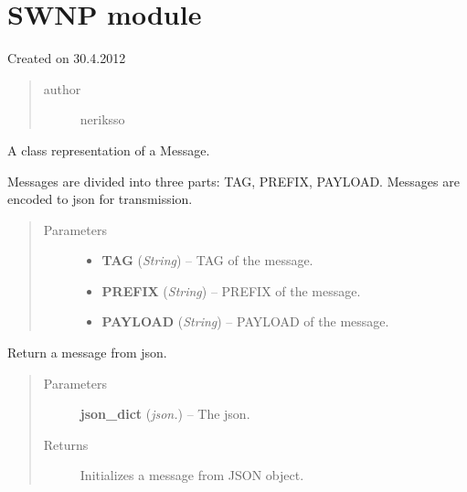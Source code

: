 \documentclass[letterpaper,10pt,english]{sphinxmanual}
\begin{document}
\section{SWNP module}
\label{swnp::doc}\label{swnp:swnp-module}\label{swnp:module-swnp}
Created on 30.4.2012
\begin{quote}\begin{description}
\item[{author}] \leavevmode
neriksso

\end{description}\end{quote}

\begin{fulllineitems}
\label{swnp:swnp.Message}
A class representation of a Message.

Messages are divided into three parts: TAG, PREFIX, PAYLOAD.
Messages are encoded to json for transmission.
\begin{quote}\begin{description}
\item[{Parameters}] \leavevmode\begin{itemize}
\item {} 
\textbf{TAG} (\emph{String}) -- TAG of the message.

\item {} 
\textbf{PREFIX} (\emph{String}) -- PREFIX of the message.

\item {} 
\textbf{PAYLOAD} (\emph{String}) -- PAYLOAD of the message.

\end{itemize}

\end{description}\end{quote}

\begin{fulllineitems}
\label{swnp:swnp.Message.from_json}
Return a message from json.
\begin{quote}\begin{description}
\item[{Parameters}] \leavevmode
\textbf{json\_dict} (\emph{json.}) -- The json.

\item[{Returns}] \leavevmode
Initializes a message from JSON object.


\end{description}
\end{quote}
\end{fulllineitems}
\end{fulllineitems}
\end{document}
